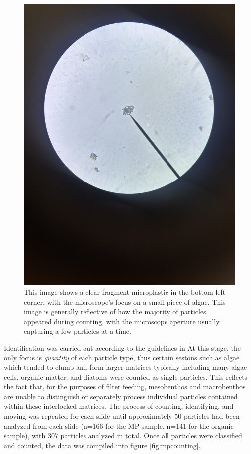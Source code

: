 \documentclass[fleqn,10pt]{SelfArx} %
\begin{document}
	\begin{figure}[h]
		\centering
		\includegraphics[width=1\linewidth]{Figures/MPOrganic}
		\caption[MP Near Organic Matter]{This image shows a clear fragment microplastic in the bottom left corner, with the microscope's focus on a small piece of algae. This image is generally reflective of how the majority of particles appeared during counting, with the microscope aperture usually capturing a few particles at a time.}
		\label{fig:mporganic}
	\end{figure}
	Identification was carried out according to the guidelines in \cite{Huang_Hu_Wang_2022} At this stage, the only focus is \emph{quantity} of each particle type, thus certain \glspl{seston} such as algae which tended to clump and form larger matrices typically including many algae cells, organic matter, and diatoms were counted as single particles. This reflects the fact that, for the purposes of filter feeding, mesobenthos and macrobenthos are unable to distinguish or separately process individual particles contained within these interlocked matrices. The process of counting, identifying, and moving was repeated for each slide until approximately 50 particles had been analyzed from each slide (n=166 for the MP sample, n=141 for the organic sample), with 307 particles analyzed in total. Once all particles were classified and counted, the data was compiled into figure \ref{fig:mpcounting}.
\end{document}
